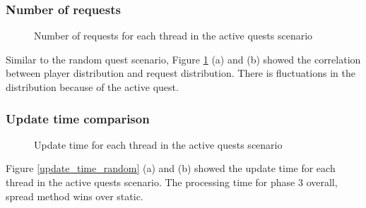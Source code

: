 \documentclass[12pt,a4paper]{article} %
\theoremstyle{definition}
\theoremstyle{remark}
\begin{document}
\subsubsection {Number of requests}
\begin{figure}[!ht]
	\hfill
	\caption{Number of requests for each thread in the active quests scenario}
	\label{Request_active}
\end{figure}
Similar to the random quest scenario, Figure \ref{Request_active} (a) and (b)  showed the correlation between player distribution and request distribution. There is fluctuations in the distribution because of the active quest. 


\subsubsection {Update time comparison}
\begin{figure}[!ht]
	\hfill
	\caption{Update time for each thread in the active quests scenario}
	\label{update_time_active}
\end{figure}
 Figure \ref{update_time_random} (a) and (b) showed the update time for each thread in the active quests scenario. The processing time for phase 3 overall, spread method wins over static.
\end{document}
